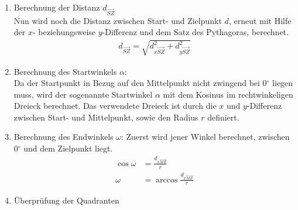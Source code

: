 \begin{itemize}
\begin{enumerate}
\item Berechnung der Distanz $d_{\overrightarrow{SZ}}$\\
Nun wird noch die Distanz zwischen Start- und Zielpunkt $d$, erneut mit Hilfe der $x$- beziehungsweise $y$-Differenz und dem Satz des Pythagoras, berechnet.
\begin{align*}
d_{\overrightarrow{SZ}} = \sqrt{d_{x\overrightarrow{SZ}}^2 + d_{y\overrightarrow{SZ}}^2}
\end{align*}
\item Berechnung des Startwinkels $\alpha$:\\
Da der Startpunkt in Bezug auf den Mittelpunkt nicht zwingend bei 0$^\circ$ liegen muss, wird der sogenannte Startwinkel $\alpha$ mit dem Kosinus im rechtwinkeligen Dreieck berechnet. Das verwendete Dreieck ist durch die $x$ und $y$-Differenz zwischen Start- und Mittelpunkt, sowie den Radius $r$ definiert.
\item Berechnung des Endwinkels $\omega$:
Zuerst wird jener Winkel berechnet, zwischen 0$^\circ$ und dem Zielpunkt liegt.
\begin{align*}
\cos \omega & = \frac{d_{x\overrightarrow{MZ}}}{r}\\
\omega & = \arccos \frac{d_{x\overrightarrow{MZ}}}{r}
\end{align*}
\item Überprüfung der Quadranten\\

\end{enumerate}
\end{itemize}
